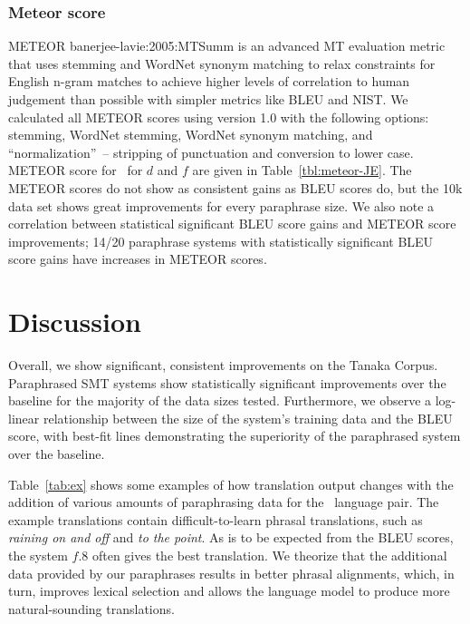 \documentclass[english]{jnlp_1.4}
\newcommand{\citep}{}
\newcommand{\JE}{}
\begin{document}
\begin{table}[p]

\end{table}


\subsubsection{Meteor score}

METEOR \citep{banerjee-lavie:2005:MTSumm} is an advanced MT evaluation
metric that uses stemming and WordNet synonym matching to relax
constraints for English n-gram matches to achieve higher levels of
correlation to human judgement than possible with simpler metrics like
BLEU and NIST. We calculated all METEOR scores using version 1.0 with
the following options: stemming, WordNet stemming, WordNet synonym
matching, and ``normalization''~\--- stripping of punctuation and
conversion to lower case. METEOR score for \JE~for $d$ and $f$ are
given in Table~\ref{tbl:meteor-JE}. The METEOR scores do not show
as consistent gains as BLEU scores do, but the 10k data set shows
great improvements for every paraphrase size. We also note a correlation
between statistical significant BLEU score gains and METEOR score
improvements; 14/20 paraphrase systems with statistically significant 
BLEU score gains have increases in METEOR scores.




\section{Discussion}

Overall, we show significant, consistent improvements on the Tanaka
Corpus. Paraphrased SMT systems show statistically significant
improvements over the baseline for the majority of the data sizes
tested. Furthermore, we observe a log-linear relationship between the
size of the system's training data and the BLEU score, with best-fit
lines demonstrating the superiority of the paraphrased system over the
baseline.

Table~\ref{tab:ex} shows some examples of how translation output
changes with the addition of various amounts of paraphrasing data for
the \JE~language pair. The example translations contain
difficult-to-learn phrasal translations, such as {\it raining on and
off} and {\it to the point}. As is to be expected from the BLEU
scores, the system $f.8$ often gives the best translation. We theorize
that the additional data provided by our paraphrases results in better
phrasal alignments, which, in turn, improves lexical selection and
allows the language model to produce more natural-sounding
translations.
\end{document}

